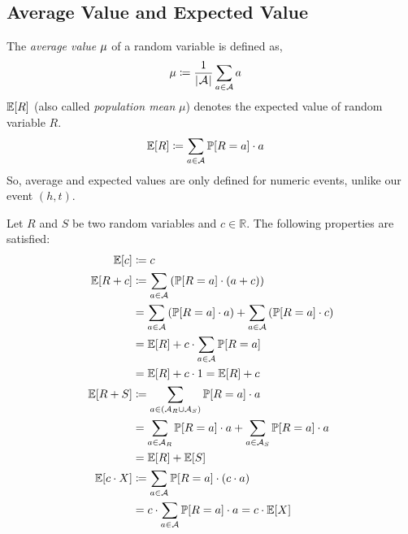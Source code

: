 \subsection{Average Value and Expected Value}
\label{sec:bp-ae}
%
The \emph{average value} $\mu$ of a random variable is defined as,
\begin{align}
  \mu &\coloneqq \frac{1}{\left|\hskip .06667em \mathcal A\hskip .06667em \right|} \sum_{a \in \mathcal A} a
\end{align}
$\mathbb E[R]$ (also called \emph{population mean} $\mu$) denotes the expected value of random variable $R$.
\begin{align}
  \mathbb E[R] &\coloneqq \sum_{a \in \mathcal A} \mathbb P[R=a] \cdot a
\end{align}
So, average and expected values are only defined for numeric events, unlike our event $(h,t)$.

Let $R$ and $S$ be two random variables and $c \in \mathbb R$.
The following properties are satisfied:
\begin{align}
  \mathbb E[c]     &\coloneqq c \\
  \mathbb E[R + c] &\coloneqq \sum_{a \in \mathcal A} \left(\mathbb P[R=a] \cdot (a + c)\right) \nonumber\\
            &= \sum_{a \in \mathcal A} \left(\mathbb P[R=a] \cdot a\right) + \sum_{a \in \mathcal A} \left(\mathbb P[R=a] \cdot c\right) \nonumber\\
            &= \mathbb E[R] + c \cdot \sum_{a \in \mathcal A} \mathbb P[R=a] \nonumber\\
            &= \mathbb E[R] + c \cdot 1 = \mathbb E[R] + c \\
  \mathbb E[R + S] &\coloneqq \sum_{a \in (\mathcal A_R \cup \mathcal A_S)} \mathbb P[R=a] \cdot a \nonumber\\
            &= \sum_{a \in \mathcal A_R} \mathbb P[R=a] \cdot a + \sum_{a \in \mathcal A_S} \mathbb P[R=a] \cdot a \nonumber\\
            &= \mathbb E[R] + \mathbb E[S] \\
  \mathbb E[c \cdot X] &\coloneqq \sum_{a \in \mathcal A} \mathbb P[R=a] \cdot (c \cdot a) \nonumber\\
            &= c \cdot \sum_{a \in \mathcal A} \mathbb P[R=a] \cdot a = c \cdot \mathbb E[X]
\end{align}

